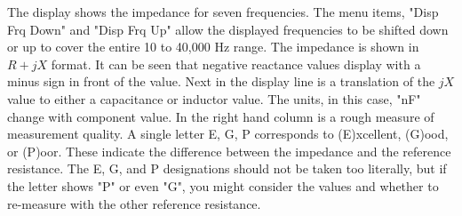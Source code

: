 %
The display shows the impedance for seven frequencies.
The menu items, "\textsf{Disp Frq Down}" and "\textsf{Disp Frq Up}" allow the displayed frequencies to be shifted down or up to cover the entire 10 to 40,000 Hz range.  The impedance is shown in  \(R+jX\) format. It can be seen that negative reactance values display with a minus sign in front of the value. Next in the display line is a translation of the  \(jX\) value to either a capacitance or inductor value. The units, in this case,  "nF" change with component value.  In the right hand column is a rough measure of measurement quality. A single letter \textsf{E, G, P} corresponds to (\textsf{E})xcellent, (\textsf{G})ood, or (\textsf{P})oor. These indicate the difference between the impedance and the reference resistance.
The \textsf{E}, \textsf{G}, and \textsf{P} designations should not be taken too literally, but if the letter shows "\textsf{P}" or even "\textsf{G}",  you might consider the values and whether to re-measure with the other reference resistance.


